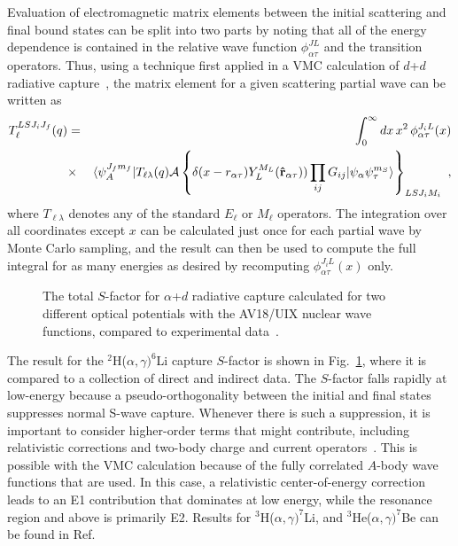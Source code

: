 Evaluation of electromagnetic matrix elements between the initial
scattering and final bound states can be split into two parts by noting 
that all of the energy dependence is contained in the relative wave 
function $\phi_{\alpha \tau}^{JL}$ and the transition operators.
Thus, using a technique first applied in a VMC calculation of $d$+$d$
radiative capture~\cite{APS91}, 
the matrix element for a given scattering partial wave can be written as
\begin{eqnarray}
\label{eqn:integrand}
T^{LSJ_iJ_f}_\ell(q) &=& \int_0^\infty dx\, x^2 \, \phi_{\alpha\tau}^{J_iL}(x)
 \\
&\times& \langle \psi_{A}^{J_fm_f}|
T_{\ell \lambda}(q) {\cal A}\left\{\delta(x-r_{\alpha\tau} )
Y_L^{M_L}({\bf\hat{r}}_{\alpha\tau}))
\prod_{ij}G_{ij}|\psi_\alpha\psi_\tau^{m_S}\rangle\right\}_{LSJ_iM_i} \ ,
\nonumber
\end{eqnarray}
where $T_{\ell \lambda}$ denotes any of the standard $E_{\ell}$ or 
$M_{\ell}$ operators.
The integration over all coordinates except $x$ can be calculated just once
for each partial wave by Monte Carlo sampling, and the result can then
be used to compute the full integral for as many energies as desired by
recomputing $\phi_{\alpha\tau}^{J_iL}(x)$ only.

\begin{figure}
\centerline{}
\caption{The total $S$-factor for $\alpha$+$d$ radiative capture calculated for
two different optical potentials with the AV18/UIX nuclear wave functions,
compared to experimental data~\protect\cite{rghr,mohr,kiener}.}
\label{fig:sfactor}
\end{figure}

The result for the $^2$H($\alpha,\gamma)^6$Li capture $S$-factor is shown
in Fig.~\ref{fig:sfactor}, where it is compared to a collection of direct
and indirect data.
The $S$-factor falls rapidly at low-energy because a pseudo-orthogonality
between the initial and final states suppresses normal S-wave capture.
Whenever there is such a suppression, it is important to consider higher-order
terms that might contribute, including relativistic corrections and two-body 
charge and current operators~\cite{CS98}.
This is possible with the VMC calculation because of the fully
correlated $A$-body wave functions that are used.
In this case, a relativistic center-of-energy correction leads to an E1 
contribution that dominates at low energy, while the resonance region and
above is primarily E2.
Results for $^3$H($\alpha,\gamma)^7$Li, and $^3$He($\alpha,\gamma)^7$Be
can be found in Ref.~\cite{N01}

